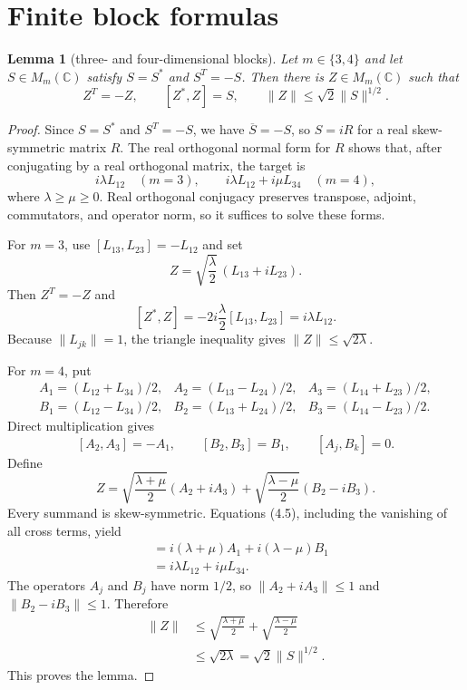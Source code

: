 \documentclass[11pt]{article}
\newtheorem{lemma}[theorem]{Lemma}
\newcommand{\C}{\mathbb C}
\newcommand{\1}{\mathbf 1}
\newcommand{\norm}[1]{\lVert #1\rVert}
\begin{document}
\section{Finite block formulas}

\begin{lemma}[three- and four-dimensional blocks]\label{lem:blocks}
Let $m\in\{3,4\}$ and let $S\in M_m(\C)$ satisfy $S=S^*$ and $S^T=-S$.
Then there is $Z\in M_m(\C)$ such that
\[
 Z^T=-Z,\qquad [Z^*,Z]=S,\qquad
 \norm{Z}\leq\sqrt2\norm{S}^{1/2}.                         \tag{4.1}
\]
\end{lemma}

\begin{proof}
Since $S=S^*$ and $S^T=-S$, we have $\overline S=-S$, so $S=iR$ for a
real skew-symmetric matrix $R$.  The real orthogonal normal form for $R$
shows that, after conjugating by a real orthogonal matrix, the target is
\[
 i\lambda L_{12}\quad(m=3),
 \qquad
 i\lambda L_{12}+i\mu L_{34}\quad(m=4),                     \tag{4.2}
\]
where $\lambda\geq\mu\geq0$.  Real orthogonal conjugacy preserves transpose,
adjoint, commutators, and operator norm, so it suffices to solve these forms.

For $m=3$, use $[L_{13},L_{23}]=-L_{12}$ and set
\[
 Z=\sqrt{\frac{\lambda}{2}}\,(L_{13}+iL_{23}).              \tag{4.3}
\]
Then $Z^T=-Z$ and
\[
 [Z^*,Z]
 =-2i\frac{\lambda}{2}[L_{13},L_{23}]
 =i\lambda L_{12}.
\]
Because $\norm{L_{jk}}=1$, the triangle inequality gives
$\norm Z\leq\sqrt{2\lambda}$.

For $m=4$, put
\[
\begin{array}{lll}
 A_1=(L_{12}+L_{34})/2,&A_2=(L_{13}-L_{24})/2,
   &A_3=(L_{14}+L_{23})/2,\\
 B_1=(L_{12}-L_{34})/2,&B_2=(L_{13}+L_{24})/2,
   &B_3=(L_{14}-L_{23})/2.
\end{array}                                                   \tag{4.4}
\]
Direct multiplication gives
\[
 [A_2,A_3]=-A_1,\qquad [B_2,B_3]=B_1,
 \qquad [A_j,B_k]=0.                                        \tag{4.5}
\]
Define
\[
 Z=\sqrt{\frac{\lambda+\mu}{2}}(A_2+iA_3)
   +\sqrt{\frac{\lambda-\mu}{2}}(B_2-iB_3).                \tag{4.6}
\]
Every summand is skew-symmetric.  Equations (4.5), including the vanishing
of all cross terms, yield
\begin{align*}
 [Z^*,Z]
 &=i(\lambda+\mu)A_1+i(\lambda-\mu)B_1\\
 &=i\lambda L_{12}+i\mu L_{34}.
\end{align*}
The operators $A_j$ and $B_j$ have norm $1/2$, so
$\norm{A_2+iA_3}\leq1$ and $\norm{B_2-iB_3}\leq1$.  Therefore
\begin{align*}
 \norm Z
 &\leq \sqrt{\frac{\lambda+\mu}{2}}
       +\sqrt{\frac{\lambda-\mu}{2}}\\
 &\leq \sqrt{2\lambda}
  =\sqrt2\norm S^{1/2}.
\end{align*}
This proves the lemma.
\end{proof}
\end{document}
